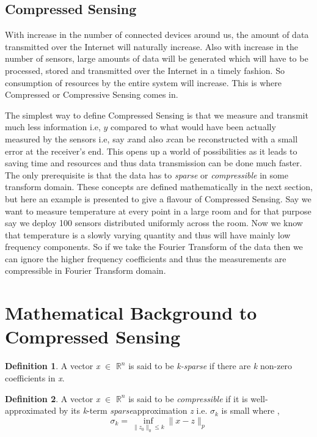 \documentclass[12pt]{article}
\theoremstyle{definition}
\newtheorem{defn}{Definition}[section]
\def\sparse{\textit{sparse}\hspace{0.1in}}
\def\x{$x$\hspace{0.1in}}
\def\y{$y$\hspace{0.1in}}
\begin{document}
  \subsection{Compressed Sensing}
  With increase in the number of connected devices around us, the amount of data transmitted over the Internet will naturally
  increase. Also with increase in the number of sensors, large amounts of data will be generated which will have to be 
  processed, stored and transmitted over the Internet in a timely fashion. So consumption of resources by the entire system
  will increase. This is where Compressed or Compressive Sensing comes in. 
  \par The simplest way to define Compressed Sensing is that we measure and transmit much less information i.e, \y 
  compared to what would have been actually measured by the sensors i.e, say \x and also \x can be reconstructed with a 
  small error at the receiver's end.
  This opens up a world of possibilities as it leads to saving time and resources and thus data transmission can be done
  much faster. The only prerequisite is that the data has to \textit{sparse} or \textit{compressible}
  in some transform domain. These concepts
  are defined mathematically in the next section, but here an example is presented to give a flavour of Compressed Sensing.
  Say we want to measure temperature at every point in a large room and for that purpose say we deploy 100 sensors distributed
  uniformly across the room. Now we know that temperature is a slowly varying quantity and thus will have mainly low
  frequency components. So if we take the Fourier Transform of the data then we can ignore the higher frequency coefficients
  and thus the measurements are compressible in Fourier Transform domain.
 
\section{Mathematical Background to Compressed Sensing}
\begin{defn}
 A vector \textit{x} $\in$ $\mathbb{R}^n$ is said to be \textit{k-sparse} if there are \textit{k} 
 non-zero coefficients in \textit{x}.
\end{defn}

\begin{defn}
 A vector \textit{x} $\in$ $\mathbb{R}^n$ is said to be \textit{compressible} if it is well-approximated by its
 \textit{k}-term \sparse approximation \textit{z} i.e. $\sigma_k$ is small where \cite{CS_book},
 \begin{equation}
\sigma_k = \inf_{\|z_0\|_0 \leq k} \| x - z \|_p
\end{equation}
\end{defn}
\end{document}
